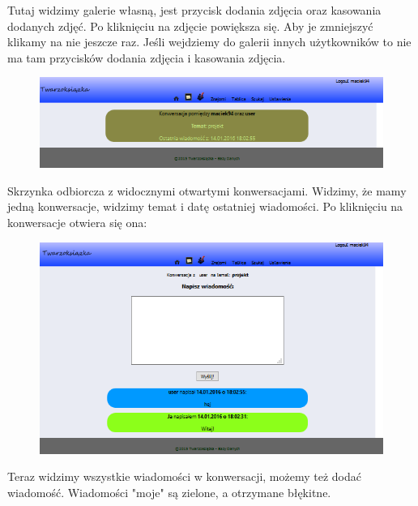 \documentclass[a4paper,10pt,table]{article}
\begin{document}
Tutaj widzimy galerie własną, jest przycisk dodania zdjęcia oraz kasowania dodanych zdjęć. Po kliknięciu na zdjęcie powiększa się. Aby je zmniejszyć klikamy na nie jeszcze raz. Jeśli wejdziemy do galerii innych użytkowników to nie ma tam przycisków dodania zdjęcia i kasowania zdjęcia.
\newpage
\begin{figure}[h]
\begin{center}
\includegraphics[scale=0.6]{scrn/5}
\end{center}
\end{figure}
Skrzynka odbiorcza z widocznymi otwartymi konwersacjami. Widzimy, że mamy jedną konwersacje, widzimy temat i datę ostatniej wiadomości. Po kliknięciu na konwersacje otwiera się ona:
\begin{figure}[h]
\begin{center}
\includegraphics[scale=0.6]{scrn/5b}
\end{center}
\end{figure}\newline
Teraz widzimy wszystkie wiadomości w konwersacji, możemy też dodać wiadomość. Wiadomości "moje" są zielone, a otrzymane błękitne.
\end{document}
